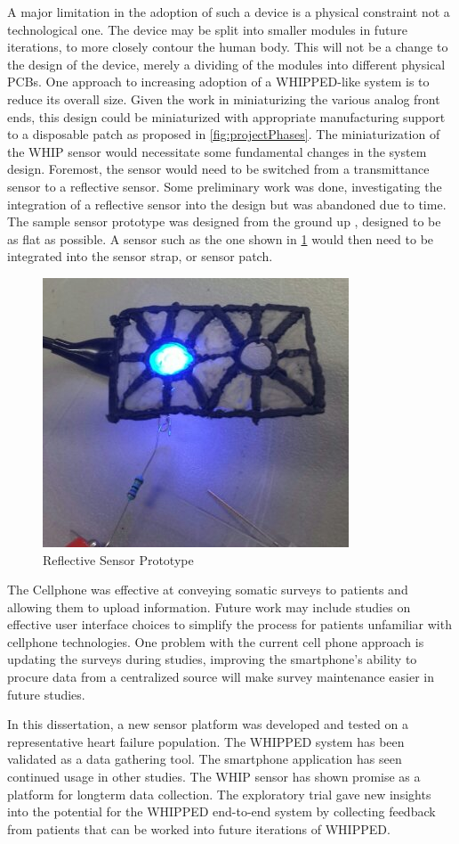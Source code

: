 A major limitation in the adoption of such a device is a physical constraint not a technological one. The device may be split into smaller modules in future iterations, to more closely contour the human body. This will not be a change to the design of the device, merely a dividing of the modules into different physical PCBs. One approach to increasing adoption of a WHIPPED-like system is to reduce its overall size. Given the work in miniaturizing the various analog front ends\cite{AFE4490,ADS1293}, this design could be miniaturized with appropriate manufacturing support to a disposable patch as proposed in \cref{fig:projectPhases}. The miniaturization of the WHIP sensor would necessitate some fundamental changes in the system design. Foremost, the  sensor would need to be switched from a transmittance sensor to a reflective sensor. Some preliminary work was done, investigating the integration of a reflective sensor into the design but was abandoned due to time. The sample sensor prototype was designed from the ground up , designed to be as flat as possible. A sensor such as the one shown in  \cref{fig:ReflectiveSensorPrototypes} would then need to be integrated into the sensor strap, or sensor patch.

\begin{figure}
\centering
\includegraphics[width=0.5\linewidth]{Images/ReflectiveSensorPrototype.png}
\caption{Reflective Sensor Prototype }
\label{fig:ReflectiveSensorPrototypes}
\end{figure}


The Cellphone was effective at conveying somatic surveys to patients and allowing them to upload information. Future work may include studies on effective user interface choices to simplify the process for patients unfamiliar with cellphone technologies. One problem with the current cell phone approach is updating the surveys during studies, improving the smartphone's ability to procure data from a centralized source will make survey maintenance easier in future studies.

In this dissertation, a new sensor platform was developed and tested on a representative heart failure population. The WHIPPED system has been validated as a data gathering tool. The smartphone application has seen continued usage in other studies. The WHIP sensor has shown promise as a platform for longterm data collection. The exploratory trial gave new insights into the potential for the WHIPPED end-to-end system by collecting feedback from patients that can be worked into future iterations of WHIPPED.

